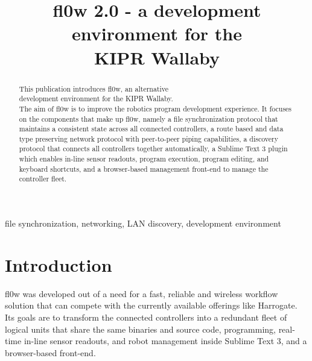 \documentclass[conference]{IEEEtran}
\begin{document}
\title{fl0w 2.0 - a development environment for the\\ KIPR Wallaby}
\author{
\and
{}
}

\maketitle


\begin{abstract}
This publication introduces fl0w, an alternative\\ development environment for the KIPR Wallaby.\\ The aim of fl0w is to improve the robotics program development experience. It focuses on the components that make up fl0w, namely a file synchronization protocol that maintains a consistent state across all connected controllers, a route based and data type preserving network protocol with peer-to-peer piping capabilities, a discovery protocol that connects all controllers together automatically, a Sublime Text 3\cite{Sublime Text 3:Sublime HQ} plugin which enables in-line sensor readouts, program execution, program editing, and keyboard shortcuts, and a browser-based management front-end to manage the controller fleet.\\
\end{abstract}

\begin{IEEEkeywords}
file synchronization, networking, LAN discovery, development environment
\end{IEEEkeywords}



\section{Introduction}
fl0w was developed out of a need for a fast, reliable and wireless workflow solution that can compete with the currently available offerings like Harrogate\cite{Harrogate:KIPR}. Its goals are to transform the connected controllers into a redundant fleet of logical units that share the same binaries and source code, programming, real-time in-line sensor readouts, and robot management inside Sublime Text 3\cite{Sublime Text 3:Sublime HQ}, and a browser-based front-end. 
\end{document}
